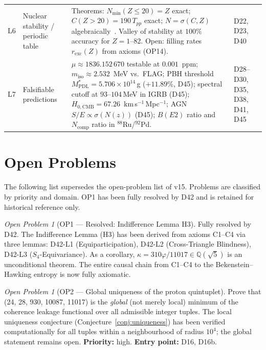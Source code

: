 \documentclass[11pt,a4paper]{article}
\theoremstyle{plain}
\theoremstyle{definition}
\theoremstyle{remark}
\newtheorem{openproblem}[theorem]{Open Problem}
\newcommand{\Tpp}{T_{pp}}
\begin{document}
\begin{longtable}{L{0.6cm}L{3.0cm}L{5.5cm}L{4.0cm}}
L6 & Nuclear stability / periodic table & \textcolor{proofblue}{Theorems}: $N_{\min}(Z\leq20)=Z$ exact; $C(Z>20)=190\,\Tpp$ exact; $N=\sigma(C,Z)$ algebraically~\cite{D40}. Valley of stability at $100\%$ accuracy for $Z=1$--82. \textcolor{openproblemred}{Open}: filling rates $r_{\mathrm{exc}}(Z)$ from axioms (OP14). & D22, D23, D40\\[0.4em]
L7 & Falsifiable predictions & $\mu\approx 1836.152\,670$ testable at $0.001$~ppm; $m_{\mathrm{iso}}\approx 2.532$~MeV vs.\ FLAG; PBH threshold $M^*_{\mathrm{PDL}}=5.706\times10^{14}$\,g ($+11.89\%$, D45); spectral cutoff at $93$--$104$\,MeV in IGRB (D45); $H_{0,\mathrm{CMB}}=67.26$~km\,s$^{-1}$\,Mpc$^{-1}$; AGN $S/E \propto \sigma(N(z))$ (D45); $B(E2)$ ratio and $N_{\mathrm{comp}}$ ratio in $^{88}$Ru/$^{92}$Pd. & D28--D30, D35, D38, D41, D45\\
\end{longtable}

\section{Open Problems}
\label{sec:openproblems}

The following list supersedes the open-problem list of v15. Problems are classified by priority and domain. OP1 has been fully resolved by D42 and is retained for historical reference only.

\begin{openproblem}[OP1 --- Resolved: Indifference Lemma H3]
\label{op:H3}
\textcolor{proofblue}{Fully resolved by D42.} The Indifference Lemma (H3) has been derived from axioms C1--C4 via three lemmas: D42-L1 (Equiparticipation), D42-L2 (Cross-Triangle Blindness), D42-L3 ($S_4$-Equivariance). As a corollary, $\kappa=310\varphi/11017\in\mathbb{Q}(\sqrt{5})$ is an unconditional theorem. The entire causal chain from C1--C4 to the Bekenstein--Hawking entropy is now fully axiomatic.
\end{openproblem}

\begin{openproblem}[OP2 --- Global uniqueness of the proton quintuplet]
\label{op:uniqueness} Prove that (24, 28, 930, 10087, 11017) is the \emph{global} (not merely local) minimum of the coherence leakage functional over all admissible integer tuples. The local uniqueness conjecture (Conjecture~\ref{conj:uniqueness}) has been verified computationally for all tuples within a neighbourhood of radius $10^4$; the global statement remains open. \textbf{Priority:} high. \textbf{Entry point:} D16, D16b.
\end{openproblem}
\end{document}
